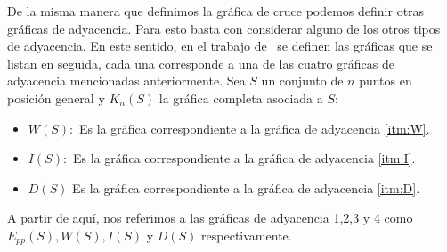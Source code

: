 %

De la misma manera que definimos la gráfica de cruce podemos definir otras
gráficas de adyacencia. Para esto basta con considerar alguno de los otros
tipos de adyacencia. En este sentido, en el trabajo de~\cite{Araujo2005} se
definen las gráficas que se listan en seguida, cada una corresponde
a una de las cuatro gráficas de adyacencia mencionadas anteriormente.
Sea $S$ un conjunto de $n$ puntos en posición general y $K_n(S)$
la gráfica completa asociada a $S$:

\begin{itemize}
  \item $W(S):$ Es la gráfica correspondiente a la gráfica de adyacencia
  \ref{itm:W}.
  \item $I(S):$ Es la gráfica correspondiente a la gráfica de adyacencia
  \ref{itm:I}.
  \item $D(S)$  Es la gráfica correspondiente a la gráfica de adyacencia
  \ref{itm:D}.
\end{itemize}
A partir de aquí, nos referimos a las gráficas de adyacencia 1,2,3 y 4 como
$E_{pp}(S),W(S),I(S)$ y $D(S)$ respectivamente.

